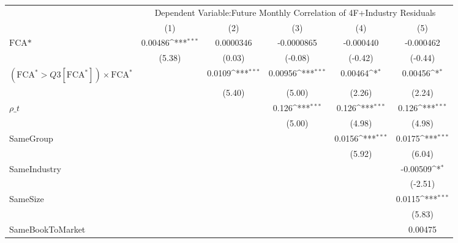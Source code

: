 {
\def\sym#1{\ifmmode^{#1}\else\(^{#1}\)\fi}
\begin{tabular}{l*{5}{c}}
\hline\hline
                &\multicolumn{5}{c}{Dependent Variable:Future Monthly Correlation of 4F+Industry Residuals}    \\\cmidrule(lr){2-6}
                &\multicolumn{1}{c}{(1)}         &\multicolumn{1}{c}{(2)}         &\multicolumn{1}{c}{(3)}         &\multicolumn{1}{c}{(4)}         &\multicolumn{1}{c}{(5)}         \\
\hline
$ \text{FCA*} $ &  0.00486\sym{***}&0.0000346         &-0.0000865         &-0.000440         &-0.000462         \\
                &   (5.38)         &   (0.03)         &  (-0.08)         &  (-0.42)         &  (-0.44)         \\
[1em]
 $ (\text{FCA}^* > Q3[\text{FCA}^*]) \times {\text{FCA} ^*}  $ &                  &   0.0109\sym{***}&  0.00956\sym{***}&  0.00464\sym{*}  &  0.00456\sym{*}  \\
                &                  &   (5.40)         &   (5.00)         &   (2.26)         &   (2.24)         \\
[1em]
 $ {\rho\_t} $   &                  &                  &    0.126\sym{***}&    0.126\sym{***}&    0.126\sym{***}\\
                &                  &                  &   (5.00)         &   (4.98)         &   (4.98)         \\
[1em]
SameGroup       &                  &                  &                  &   0.0156\sym{***}&   0.0175\sym{***}\\
                &                  &                  &                  &   (5.92)         &   (6.04)         \\
[1em]
SameIndustry    &                  &                  &                  &                  & -0.00509\sym{*}  \\
                &                  &                  &                  &                  &  (-2.51)         \\
[1em]
SameSize        &                  &                  &                  &                  &   0.0115\sym{***}\\
                &                  &                  &                  &                  &   (5.83)         \\
[1em]
SameBookToMarket&                  &                  &                  &                  &  0.00475         \\

\end{tabular}}
